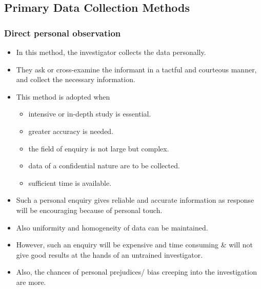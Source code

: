 \documentclass[
10pt, %
a4paper, %
]{report}
\begin{document}
\subsection*{Primary Data Collection Methods}

\subsubsection*{Direct personal observation}
\begin{itemize}
\item In this method, the investigator collects the data personally.
\item They ask or cross-examine the informant in a tactful and courteous manner, and collect the necessary information.
\item This method is adopted when
\begin{itemize}
\item intensive or in-depth study is essential.
\item greater accuracy is needed.
\item the field of enquiry is not large but complex.
\item data of a confidential nature are to be collected.
\item sufficient time is available.
\end{itemize}
\item Such a personal enquiry gives reliable and accurate information as
response will be encouraging because of personal touch.
\item Also uniformity and homogeneity of data can be maintained.
\item However, such an enquiry will be expensive and time consuming \& will not give good results at the hands of an untrained investigator.
\item Also, the chances of personal prejudices/ bias creeping into the investigation are more.
\end{itemize}
\end{document}
